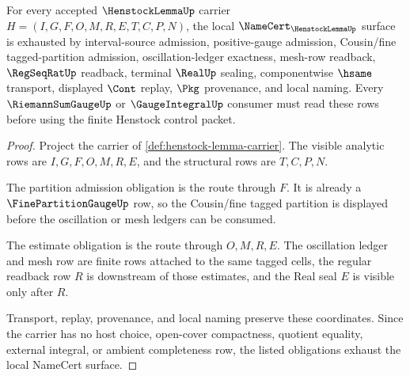 \begin{theorem}
\label{thm:henstock-lemma-namecert-obligations}
For every accepted $\HenstockLemmaUp$ carrier $H=(I,G,F,O,M,R,E,T,C,P,N)$, the local $\NameCert_{\HenstockLemmaUp}$ surface is exhausted by interval-source admission, positive-gauge admission, Cousin/fine tagged-partition admission, oscillation-ledger exactness, mesh-row readback, $\RegSeqRatUp$ readback, terminal $\RealUp$ sealing, componentwise $\hsame$ transport, displayed $\Cont$ replay, $\Pkg$ provenance, and local naming. Every $\RiemannSumGaugeUp$ or $\GaugeIntegralUp$ consumer must read these rows before using the finite Henstock control packet.
\end{theorem}
\begin{proof}
Project the carrier of \autoref{def:henstock-lemma-carrier}. The visible analytic rows are $I,G,F,O,M,R,E$, and the structural rows are $T,C,P,N$.

The partition admission obligation is the route through $F$. It is already a $\FinePartitionGaugeUp$ row, so the Cousin/fine tagged partition is displayed before the oscillation or mesh ledgers can be consumed.

The estimate obligation is the route through $O,M,R,E$. The oscillation ledger and mesh row are finite rows attached to the same tagged cells, the regular readback row $R$ is downstream of those estimates, and the Real seal $E$ is visible only after $R$.

Transport, replay, provenance, and local naming preserve these coordinates. Since the carrier has no host choice, open-cover compactness, quotient equality, external integral, or ambient completeness row, the listed obligations exhaust the local NameCert surface.
\end{proof}

